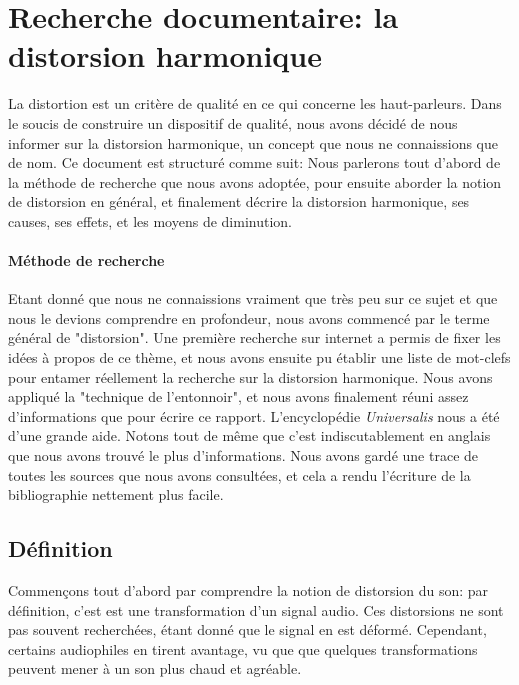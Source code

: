 \documentclass{article}
\begin{document}
\section{Recherche documentaire: la distorsion harmonique}


La distortion est un critère de qualité en ce qui concerne les haut-parleurs. Dans le soucis de construire un dispositif de qualité, nous avons décidé de nous informer sur la distorsion harmonique, un concept que nous ne connaissions que de nom.
Ce document est structuré comme suit: Nous parlerons tout d'abord de la méthode de recherche que nous avons adoptée, pour ensuite aborder la notion  de distorsion en général, et finalement décrire la distorsion harmonique, ses causes, ses effets, et les moyens de diminution.

\paragraph{Méthode de recherche}
Etant donné que nous ne connaissions vraiment que très peu sur ce sujet et que nous le devions comprendre en profondeur, nous avons commencé par le terme général de "distorsion". Une première recherche sur internet a permis de fixer les idées à propos de ce thème, et nous avons ensuite pu établir une liste de mot-clefs pour entamer réellement la recherche sur la distorsion harmonique. Nous avons appliqué la "technique de l'entonnoir", et nous avons finalement réuni assez d'informations que pour écrire ce rapport. L'encyclopédie \textit{Universalis} nous a été d'une grande aide. Notons tout de même que c'est indiscutablement en anglais que nous avons trouvé le plus d'informations. Nous avons gardé une trace de toutes les sources que nous avons consultées, et cela a rendu l'écriture de la bibliographie nettement plus facile.



\subsection{Définition}
Commençons tout d'abord par comprendre la notion de distorsion du son: par définition, c'est est une transformation d'un signal audio. Ces distorsions ne sont pas souvent recherchées, étant donné que le signal en est déformé. Cependant, certains audiophiles en tirent avantage, vu que que quelques transformations peuvent mener à un son plus chaud et agréable.
\end{document}
